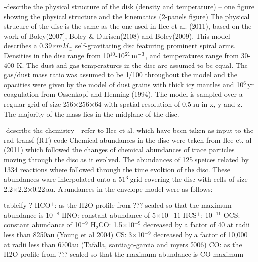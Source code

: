 \documentclass[useAMS,usenatbib]{mn2e}
\begin{document}
-describe the physical structure of the disk (density and temperature) -- one figure showing the physical structure and the kinematics (2-panels figure)
The physical strucure of the disc is the same as the one used in Ilee et al. (2011), based on the work of Boley(2007), Boley \& Durisen(2008) and Boley(2009). This model describes a 0.39$\,rm{M}_\odot$ self-gravitating disc featuring prominent spiral arms. Densities in the disc range from 10$^{10}$-10$^{21}\,\rm{m}^{-3}$, and temperatures range from 30-400 K. The dust and gas temperatures in the disc are assumed to be equal. The gas/dust mass ratio was assumed to be 1/100 throughout the model and the opacities were given by the model of dust grains with thick icy mantles and 10$^6\,$yr coagulation from Ossenkopf and Henning (1994). The model is sampled over a regular grid of size 256$\times$256$\times$64 with spatial resolution of 0.5$\,$au in x, y and z. The majority of the mass lies in the midplane of the disc.\newline

-describe the chemistry  - refer to Ilee et al. which have been taken as input to the rad transf (RT) code
Chemical abundances in the disc were taken from Ilee et. al (2011) which followed the changes of chemical abundances of trace particles moving through the disc as it evolved. The abundances of 125 speices related by 1334 reactions where followed through the time evoltion of the disc. These abundances ware interpolated onto a 51$^3$ grid covering the disc with cells of size 2.2$\times$2.2$\times$0.22$\,$au. Abundances in the envelope model were as follows:\newline

tableify ?
HCO$^+$: as the H2O profile from ??? scaled so that the maximum abundance is 10$^{-8}$
HNO: constant abundance of 5$\times$10${-11}$
HCS$^+$: 10$^{-11}$
OCS: constant abundance of 10$^{-9}$
H$_2$CO: 1.5$\times$10$^{-9}$ decreased by a factor of 40 at radii less than 8250au (Young et al 2004)
CS:  3$\times$10$^{-9}$ decreased by a factor of 10,000 at radii less than 6700au (Tafalla, santiago-garcia and myers 2006)
CO: as the H2O profile from ??? scaled so that the maximum abundance is CO maximum\newline
\end{document}
